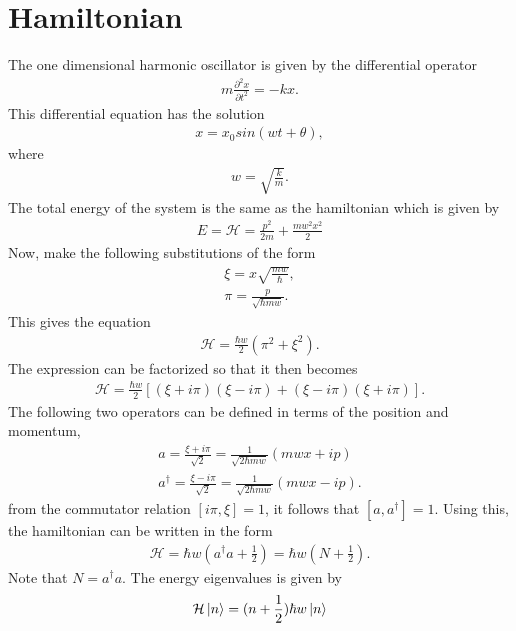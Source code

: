 \documentclass[12pt]{article}
\begin{document}
\section{Hamiltonian}
The one dimensional harmonic oscillator is given by the differential operator
\begin{gather}
m \frac{\partial^2 x}{\partial t^2} = -kx.
\end{gather}
This differential equation has the solution
\begin{gather}
x=x_0 sin(wt + \theta),
\end{gather}
where
\begin{gather}
w=\sqrt{\frac{k}{m}}.
\end{gather}
The total energy of the system is the same as the hamiltonian which is given by
\begin{gather}
E = \mathcal{H} = \frac{p^2}{2m} + \frac{mw^2x^2}{2}
\end{gather}
Now, make the following substitutions of the form 
\begin{gather}
\xi = x \sqrt{\frac{mw}{\hbar}}, \\
\pi = \frac{p}{\sqrt{\hbar mw}}. 
\end{gather}
This gives the equation
\begin{gather}
\mathcal{H} = \frac{\hbar w}{2}(\pi^2+\xi^2).
\end{gather}
The expression can be factorized so that it then becomes
\begin{gather}
\mathcal{H} = \frac{\hbar w}{2}[(\xi + i \pi)(\xi - i \pi) + (\xi - i \pi)(\xi + i \pi)].
\end{gather}
The following two operators can be defined in terms of the position and momentum, 
\begin{gather}
a = \frac{\xi + i \pi}{\sqrt{2}} = \frac{1}{\sqrt{2 \hbar m w}}(mwx + ip) \\
a^\dagger = \frac{\xi - i \pi}{\sqrt{2}} = \frac{1}{\sqrt{2 \hbar m w}}(mwx - ip).
\end{gather}
from the commutator relation $[i \pi,\xi] = 1$, it follows that $[a,a^\dagger] = 1$. Using this, the hamiltonian can be written in the form
\begin{gather}
\mathcal{H} = \hbar w (a^\dagger a + \frac{1}{2}) = \hbar w (N + \frac{1}{2}).
\label{hamil}
\end{gather}
Note that $N = a^\dagger a$. The energy eigenvalues is given by
\begin{gather}
\mathcal{H}\Ket{n} = (n+\frac{1}{2})\hbar w\Ket{n}
\end{gather}
\end{document}
